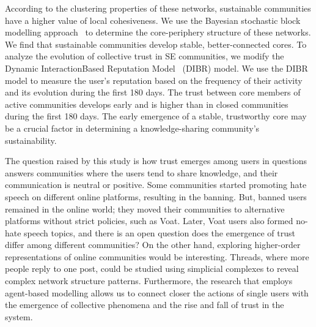 According to the clustering properties of these networks, sustainable communities have a higher value of local cohesiveness. We use the Bayesian stochastic block modelling approach~\cite{gallagher2020clarified} to determine the core-periphery structure of these networks. We find that sustainable communities develop stable, better-connected cores. To analyze the evolution of collective trust in SE communities, we modify the Dynamic InteractionBased Reputation Model~\cite{melnikov2018toward} (DIBR) model. We use the DIBR model to measure the user's reputation based on the frequency of their activity and its evolution during the first 180 days. The trust between core members of active communities develops early and is higher than in closed communities during the first 180 days. The early emergence of a stable, trustworthy core may be a crucial factor in determining a knowledge-sharing community's sustainability. 

The question raised by this study is how trust emerges among users in questions answers communities where the users tend to share knowledge, and their communication is neutral or positive. Some communities started promoting hate speech on different online platforms, resulting in the banning. But, banned users remained in the online world; they moved their communities to alternative platforms without strict policies, such as Voat. Later, Voat users also formed no-hate speech topics, and there is an open question does the emergence of trust differ among different communities? On the other hand, exploring higher-order representations of online communities would be interesting. Threads, where more people reply to one post, could be studied using simplicial complexes to reveal complex network structure patterns. Furthermore, the research that employs agent-based modelling allows us to connect closer the actions of single users with the emergence of collective phenomena and the rise and fall of trust in the system. 




	

